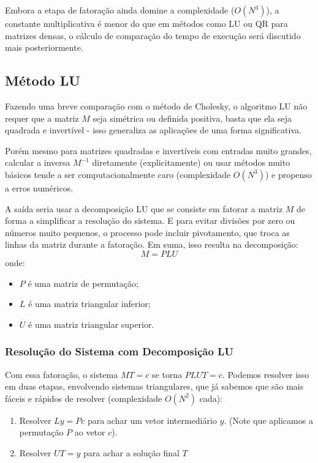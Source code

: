 \documentclass{article}
\begin{document}
    Embora a etapa de fatoração ainda domine a complexidade ($O(N^3)$), a constante multiplicativa é menor do que em métodos como LU ou QR para matrizes densas, o cálculo de comparação do tempo de execução será discutido mais posteriormente.

    \subsection{Método LU}

    Fazendo uma breve comparação com o método de Cholesky, o algoritmo LU não requer que a matriz $M$ seja simétrica ou definida positiva, basta que ela seja quadrada e invertível - isso generaliza as aplicações de uma forma significativa.

    Porém mesmo para matrizes quadradas e invertíveis com entradas muito grandes, calcular a inversa $M^{-1}$ diretamente (explicitamente) ou usar métodos muito básicos tende a ser computacionalmente caro (complexidade $O(N^3)$) e propenso a erros numéricos.

    A saída seria usar a decomposição LU que se consiste em fatorar a matriz $M$ de forma a simplificar a resolução do sistema. E para evitar divisões por zero ou números muito pequenos, o processo pode incluir pivotamento, que troca as linhas da matriz durante a fatoração. Em suma, isso resulta na decomposição:
    \[ M = PLU \]
    onde:

    \begin{itemize}[leftmargin=*]
        \item $P$ é uma matriz de permutação;
        \item $L$ é uma matriz triangular inferior;
        \item $U$ é uma matriz triangular superior.
    \end{itemize}

    \subsubsection{Resolução do Sistema com Decomposição LU}

    Com essa fatoração, o sistema $MT = c$ se torna $PLUT = c$. Podemos resolver isso em duas etapas, envolvendo sistemas triangulares, que já sabemos que são mais fáceis e rápidos de resolver (complexidade $O(N^2)$ cada):

    \begin{enumerate}
        \item Resolver $Ly = Pc$ para achar um vetor intermediário $y$. (Note que aplicamos a permutação $P$ ao vetor $c$).
        \item Resolver $UT = y$ para achar a solução final $T$
    \end{enumerate}
\end{document}
